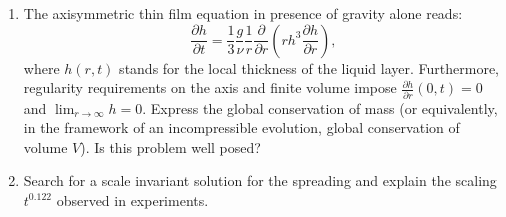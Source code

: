 \documentclass[11pt,a4paper]{article}
\newcommand{\lp}{\left(}
\newcommand{\rp}{\right)}
\newcommand{\pd}[2]{\frac{\partial #1}{\partial #2}}
\begin{document}
\begin{enumerate}
\item The axisymmetric thin film equation in presence of gravity alone reads:
\begin{equation}
\pd{h}{t}=\frac{1}{3}\frac{g}{\nu}\frac{1}{r}\pd{}{r}\lp rh^3\pd{h}{r}\rp,
\end{equation}
where $h(r,t)$ stands for the local thickness of the liquid layer. Furthermore, regularity requirements on the axis and finite volume impose $\pd{h}{r}(0,t) = 0$ and $\lim_{r\to\infty}h= 0$. Express the global conservation of mass (or equivalently, in the framework of an incompressible evolution, global conservation of volume $V$). Is this problem well posed?
\item Search for a scale invariant solution for the spreading and explain the scaling $t^{0.122}$ observed in experiments.
\end{enumerate}


\end{document}
